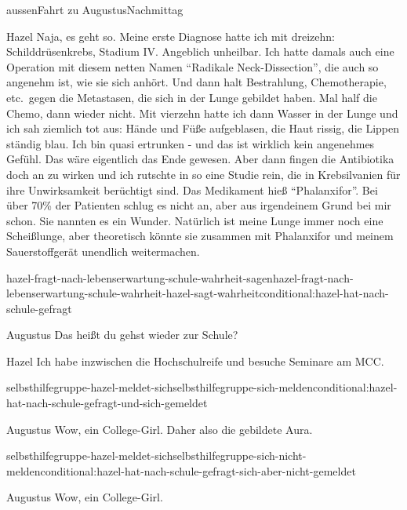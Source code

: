 \documentclass[12pt]{article}
\begin{document}
\begin{scene}{aussen}{Fahrt zu Augustus}{Nachmittag}
        \begin{dialog}{Hazel}
            Naja, es geht so.
            Meine erste Diagnose hatte ich mit dreizehn: Schilddrüsenkrebs, Stadium IV\@.
            Angeblich unheilbar.
            Ich hatte damals auch eine Operation mit diesem netten Namen ``Radikale Neck-Dissection'', die auch so angenehm ist, wie sie sich anhört.
            Und dann halt Bestrahlung, Chemotherapie, etc.~gegen die Metastasen, die sich in der Lunge gebildet haben.
            Mal half die Chemo, dann wieder nicht.
            Mit vierzehn hatte ich dann Wasser in der Lunge und ich sah ziemlich tot aus:
            Hände und Füße aufgeblasen, die Haut rissig, die Lippen ständig blau.
            Ich bin quasi ertrunken - und das ist wirklich kein angenehmes Gefühl.
            Das wäre eigentlich das Ende gewesen.
            Aber dann fingen die Antibiotika doch an zu wirken und ich rutschte in so eine Studie rein, die in Krebsilvanien für ihre Unwirksamkeit berüchtigt sind.
            Das Medikament hieß ``Phalanxifor''.
            Bei über 70\% der Patienten schlug es nicht an, aber aus irgendeinem Grund bei mir schon.
            Sie nannten es ein Wunder.
            Natürlich ist meine Lunge immer noch eine Scheißlunge, aber theoretisch könnte sie zusammen mit Phalanxifor und meinem Sauerstoffgerät unendlich weitermachen.
        \end{dialog}

        \begin{conditional}{hazel-fragt-nach-lebenserwartung-schule-wahrheit-sagen}{hazel-fragt-nach-lebenserwartung-schule-wahrheit-hazel-sagt-wahrheit}{conditional:hazel-hat-nach-schule-gefragt}
            \begin{dialog}{Augustus}
                Das heißt du gehst wieder zur Schule?
            \end{dialog}

            \begin{dialog}{Hazel}
                Ich habe inzwischen die Hochschulreife und besuche Seminare am MCC\@.
            \end{dialog}

            \begin{conditional}{selbsthilfegruppe-hazel-meldet-sich}{selbsthilfegruppe-sich-melden}{conditional:hazel-hat-nach-schule-gefragt-und-sich-gemeldet}
                \begin{dialog}{Augustus}
                    Wow, ein College-Girl.
                    Daher also die gebildete Aura.
                \end{dialog}
            \end{conditional}
            \begin{conditional}{selbsthilfegruppe-hazel-meldet-sich}{selbsthilfegruppe-sich-nicht-melden}{conditional:hazel-hat-nach-schule-gefragt-sich-aber-nicht-gemeldet}
                \begin{dialog}{Augustus}
                    Wow, ein College-Girl.
                \end{dialog}
            \end{conditional}
        \end{conditional}


\end{scene}
\end{document}
